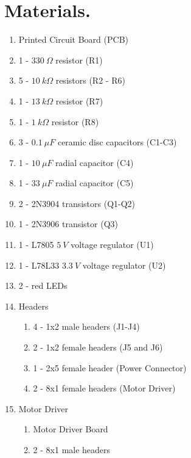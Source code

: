 \documentclass{handout}
\begin{document}
	\section{Materials.}
\begin{minipage}{.5\textwidth}
	\begin{enumerate}
		\item Printed Circuit Board (PCB)
		\item 1 - $330\ \Omega$ resistor (R1)
		\item 5 - $10\ k\Omega$ resistors (R2 - R6)
		\item 1 - $13\ k\Omega$ resistor (R7)
		\item 1 - $1\ k\Omega$ resistor (R8)
		\item 3 - $0.1\ \mu F$ ceramic disc capacitors (C1-C3)
		\item 1 - $10\ \mu F$ radial capacitor (C4)
		\item 1 - $33\ \mu F$ radial capacitor (C5)
		\item 2 - 2N3904 transistors (Q1-Q2)
		\item 1 - 2N3906 transistor (Q3)
	\end{enumerate}
\end{minipage}\hfill
\begin{minipage}{.5\textwidth}
	\begin{enumerate}\setcounter{enumi}{10}
		\item 1 - L7805 $5\ V$ voltage regulator (U1)
		\item 1 - L78L33 $3.3\ V$ voltage regulator (U2)
		\item 2 - red LEDs
		\item Headers
		\begin{enumerate}
			\item 4 - 1x2 male headers (J1-J4)
			\item 2 - 1x2 female headers (J5 and J6)
			\item 1 - 2x5 female header (Power Connector)
			\item 2 - 8x1 female headers (Motor Driver)
		\end{enumerate}
		\item Motor Driver
		\begin{enumerate}
			\item Motor Driver Board
			\item 2 - 8x1 male headers
		\end{enumerate}
	\end{enumerate}
\end{minipage}
\end{document}
